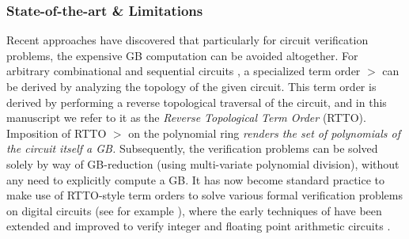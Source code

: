 \subsubsection{State-of-the-art \& Limitations} Recent
approaches \cite{wienand:cav08} \cite{lv:tcad2013} have discovered that
particularly for circuit verification problems, the
expensive GB computation can be avoided altogether. For arbitrary
combinational \cite{wienand:cav08} \cite{lv:tcad2013} and sequential
circuits \cite{xiaojun:hldvt2016}, a specialized term order 
$>$ can be derived by analyzing the topology of the given 
circuit. This term order is derived by performing a reverse
topological traversal of the circuit, and in this manuscript we refer 
to it as the {\it Reverse Topological Term Order} (RTTO). 
Imposition of RTTO $>$ on the polynomial ring
{\it renders the set of polynomials of the circuit itself a
GB.} Subsequently, the verification problems can be solved solely by
way of GB-reduction (using multi-variate polynomial division), without
any need to explicitly compute a GB. It has now become standard
practice to make use of RTTO-style term orders to solve various formal 
verification problems on digital circuits 
(see for example
\cite{wienand:cav08,lv:tcad2013,wedler:date11,ciesielski:dac2015,farimah:micro2015,rolf:date16}), 
where the early techniques of \cite{wienand:cav08} \cite{lv:tcad2013}
have been extended and improved to verify integer and floating point
arithmetic circuits \cite{ciesielski:dac2015,rolf:date16,rolf:fmcad17}. 



